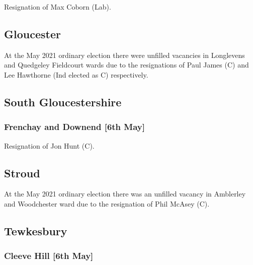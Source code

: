 \documentclass[a4paper,openany]{book}
\begin{document}
\begin{resultsiii}

Resignation of Max Coborn (Lab).

\subsection*{Gloucester}

At the May 2021 ordinary election there were unfilled vacancies in Longlevens and Quedgeley Fieldcourt wards due to the resignations of Paul James (C) and Lee Hawthorne (Ind elected as C) respectively.

\subsection*{South Gloucestershire}

\subsubsection*{Frenchay and Downend \hspace*{\fill}\nolinebreak[1]%
	\enspace\hspace*{\fill}
	[6th May]}


Resignation of Jon Hunt (C).

\subsection*{Stroud}

At the May 2021 ordinary election there was an unfilled vacancy in Amblerley and Woodchester ward due to the resignation of Phil McAsey (C).

\subsection*{Tewkesbury}

\subsubsection*{Cleeve Hill \hspace*{\fill}\nolinebreak[1]%
	\enspace\hspace*{\fill}
	[6th May]}


\end{resultsiii}
\end{document}
